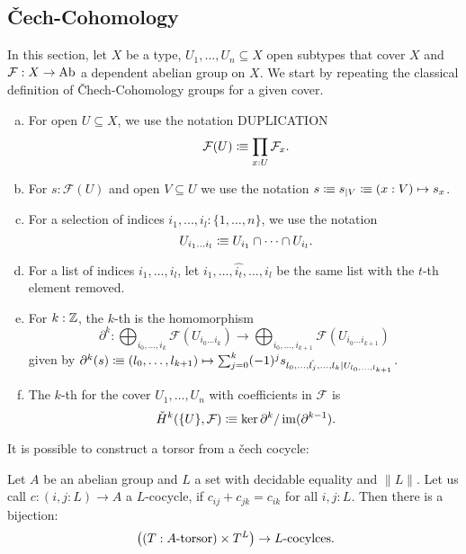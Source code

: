 \subsection{Čech-Cohomology}

In this section, let $X$ be a type, $U_1,\dots,U_n\subseteq X$ open subtypes that cover $X$
and $\mathcal F:X\to \operatorname{Ab}$ a dependent abelian group on $X$.
We start by repeating the classical definition of \v{C}hech-Cohomology groups for a given cover.

\begin{definition}%
  \label{chech-complex}
  \begin{enumerate}[(a)]
  \item {} For open $U\subseteq X$, we use the notation {\color{purple} DUPLICATION}
    \[
      \mathcal F(U)\colonequiv \prod_{x:U}\mathcal F_x\rlap{.}
    \]
  \item For $s:\mathcal F(U)$ and open $V\subseteq U$ we use the notation $s\vcentcolon\mspace{-1.2mu}\equiv s_{|V} \vcentcolon\mspace{-1.2mu}\equiv (x:V)\mapsto s_x$.
  \item {}For a selection of indices $i_1,...,i_l:\{1,\dots,n\}$, we use the notation
    \[
      U_{i_1\dots i_l}\colonequiv U_{i_1}\cap\dots\cap U_{i_l}\rlap{.}
    \]
  \item For a list of indices $i_1,\dots,i_l$, let $i_1,\dots,\hat{i_t},\dots,i_l$ be the same list with the $t$-th element removed.
  \item For $k:\mathbb{Z}$, the $k$-th  is the homomorphism
    \[
      \partial^k:\bigoplus_{i_0,\dots,i_k}\mathcal F(U_{i_0\dots i_k})\to \bigoplus_{i_0,\dots,i_{k+1}}\mathcal F(U_{i_0\dots i_{k+1}})
    \]
    given by $\partial^k(s)\vcentcolon\mspace{-1.2mu}\equiv (l_0,\dots,l_{k+1}) \mapsto \sum_{j=0}^k (-1)^j s_{l_0,\dots,\hat{l_j},\dots,l_k|U_{l_0,\dots,l_{k+1}}}$.
  \item The $k$-th  for the cover $U_1,\dots,U_n$ with coefficients in $\mathcal F$ is
    \[
      \check{H}^k(\{U\},\mathcal F)\colonequiv \ker\partial^{k} / \im(\partial^{k-1})\rlap{.}
    \]
  \end{enumerate}
\end{definition}

It is possible to construct a torsor from a \v{c}ech cocycle:

\begin{lemma}%
  \label{deligne-construction}
  Let $A$ be an abelian group and $L$ a set with decidable equality and $\|L\|$.
  Let us call $c:(i,j:L)\to A$ a $L$-cocycle, if $c_{ij}+c_{jk}=c_{ik}$ for all $i,j:L$.
  Then there is a bijection:
  \[
    \left((T:\text{$A$-torsor})\times T^L\right) \to \text{$L$-cocylces}
    \rlap{.}
  \]
\end{lemma}

